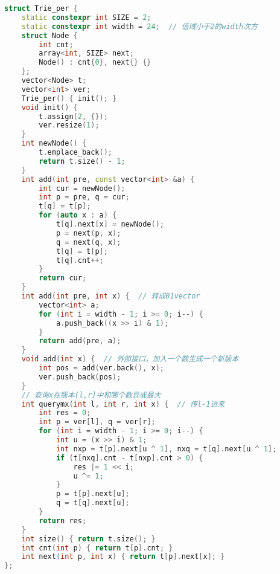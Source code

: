 \begin{lstlisting}[language=C++]
struct Trie_per {
    static constexpr int SIZE = 2;
    static constexpr int width = 24;  // 值域小于2的width次方
    struct Node {
        int cnt;
        array<int, SIZE> next;
        Node() : cnt{0}, next{} {}
    };
    vector<Node> t;
    vector<int> ver;
    Trie_per() { init(); }
    void init() {
        t.assign(2, {});
        ver.resize(1);
    }
    int newNode() {
        t.emplace_back();
        return t.size() - 1;
    }
    int add(int pre, const vector<int> &a) {
        int cur = newNode();
        int p = pre, q = cur;
        t[q] = t[p];
        for (auto x : a) {
            t[q].next[x] = newNode();
            p = next(p, x);
            q = next(q, x);
            t[q] = t[p];
            t[q].cnt++;
        }
        return cur;
    }
    int add(int pre, int x) {  // 转成01vector
        vector<int> a;
        for (int i = width - 1; i >= 0; i--) {
            a.push_back((x >> i) & 1);
        }
        return add(pre, a);
    }
    void add(int x) {  // 外部接口，加入一个数生成一个新版本
        int pos = add(ver.back(), x);
        ver.push_back(pos);
    }
    // 查询x在版本(l,r]中和哪个数异或最大
    int querymx(int l, int r, int x) {  // 传l-1进来
        int res = 0;
        int p = ver[l], q = ver[r];
        for (int i = width - 1; i >= 0; i--) {
            int u = (x >> i) & 1;
            int nxp = t[p].next[u ^ 1], nxq = t[q].next[u ^ 1];
            if (t[nxq].cnt - t[nxp].cnt > 0) {
                res |= 1 << i;
                u ^= 1;
            }
            p = t[p].next[u];
            q = t[q].next[u];
        }
        return res;
    }
    int size() { return t.size(); }
    int cnt(int p) { return t[p].cnt; }
    int next(int p, int x) { return t[p].next[x]; }
};
\end{lstlisting}
